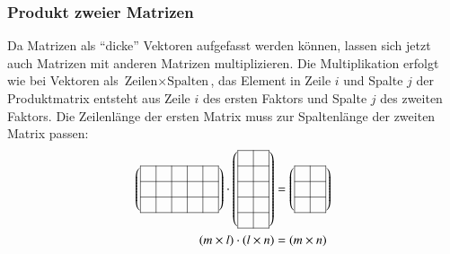 \subsubsection{Produkt zweier Matrizen}
Da Matrizen als ``dicke'' Vektoren aufgefasst werden können, lassen
sich jetzt auch Matrizen mit anderen Matrizen multiplizieren.
Die Multiplikation erfolgt wie bei Vektoren als
$\text{Zeilen}\times\text{Spalten}$, das Element in Zeile $i$
und Spalte $j$ der Produktmatrix entsteht aus Zeile $i$ des ersten
Faktors und Spalte $j$ des zweiten Faktors.
Die Zeilenlänge der ersten Matrix muss zur Spaltenlänge
der zweiten Matrix passen:
\begin{align*}
\left(\begin{tabular}{|c|c|c|c|c|}
\hline
&&&&\\
\hline
&&&&\\
\hline
&&&&\\
\hline
\end{tabular}\right)
\cdot
\left(\begin{tabular}{|c|c|}
\hline
&\\
\hline
&\\
\hline
&\\
\hline
&\\
\hline
&\\
\hline
\end{tabular}\right)
&=
\left(\begin{tabular}{|c|c|}
\hline
&\\
\hline
&\\
\hline
&\\
\hline
\end{tabular}\right)
\\
(m\times l)\cdot (l\times n)&=(m\times n)
\end{align*}
